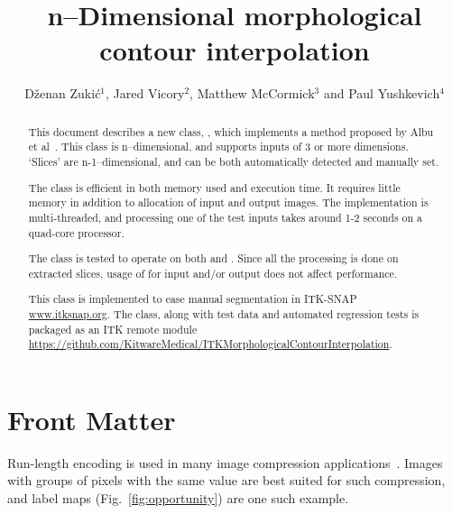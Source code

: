 \documentclass{InsightArticle}
\title{n--Dimensional morphological contour interpolation}
\author{D{\v z}enan Zuki{\' c}$^{1}$, Jared Vicory$^{2}$, Matthew McCormick$^{3}$ and Paul Yushkevich$^{4}$}
\newcommand{\IJhandlerIDnumber}{1338}
\begin{document}
\IJhandlefooter{\IJhandlerIDnumber}

\ifpdf
\else
\fi

\maketitle

\ifhtml
\chapter*{Front Matter\label{front}}
\fi


\begin{abstract}
\noindent
This document describes a new class, ,
which implements a method proposed by Albu et al~\cite{Albu2008}.
This class is n--dimensional, and supports inputs of 3 or more dimensions.
`Slices' are n-1--dimensional, and can be both automatically detected and manually set.

The class is efficient in both memory used and execution time.
It requires little memory in addition to allocation of input and output images.
The implementation is multi-threaded, and processing one of the test inputs
takes around 1-2 seconds on a quad-core processor.

The class is tested to operate on both  and .
Since all the processing is done on extracted slices,
usage of  for input and/or output does not affect performance.

This class is implemented to ease manual segmentation in ITK-SNAP \url{www.itksnap.org}.
The class, along with test data and automated regression tests is packaged as an ITK
remote module \url{https://github.com/KitwareMedical/ITKMorphologicalContourInterpolation}.
\end{abstract}

\IJhandlenote{\IJhandlerIDnumber}

\tableofcontents


Run-length encoding is used in many image compression applications~\cite{wikiRLE}.
Images with groups of pixels with the same value are best suited for such compression,
and label maps (Fig.~\ref{fig:opportunity}) are one such example.
\end{document}
